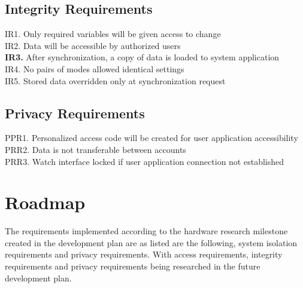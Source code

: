 \documentclass{article}
\begin{document}
\subsection{Integrity Requirements}

IR1. Only required variables will be given access to change
\\IR2. Data will be accessible by authorized users
\\\textbf{IR3.} After synchronization, a copy of data is loaded to system application   
\\IR4. No pairs of modes allowed identical settings
\\IR5. Stored data overridden only at synchronization request

\subsection{Privacy Requirements}

PPR1. Personalized access code will be created for user application accessibility 
\\PRR2. Data is not transferable between accounts
\\PRR3. Watch interface locked if user application connection not established


\section{Roadmap}

The requirements implemented according to the hardware research milestone created in the development plan are as listed are the following, system isolation requirements and privacy requirements. With access requirements, integrity requirements and privacy requirements being researched in the future development plan.
\end{document}
